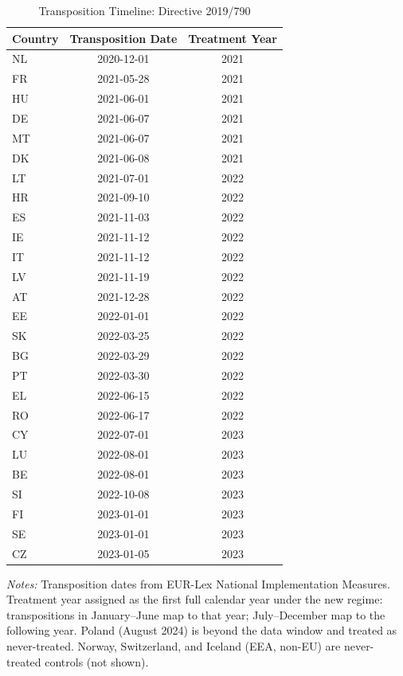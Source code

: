 \begin{table}[htbp]
\centering
\caption{Transposition Timeline: Directive 2019/790}
\label{tab:transposition}
\begin{tabular}{lcc}
\hline\hline
Country & Transposition Date & Treatment Year \\
\hline
NL & 2020-12-01 & 2021 \\
FR & 2021-05-28 & 2021 \\
HU & 2021-06-01 & 2021 \\
DE & 2021-06-07 & 2021 \\
MT & 2021-06-07 & 2021 \\
DK & 2021-06-08 & 2021 \\
LT & 2021-07-01 & 2022 \\
HR & 2021-09-10 & 2022 \\
ES & 2021-11-03 & 2022 \\
IE & 2021-11-12 & 2022 \\
IT & 2021-11-12 & 2022 \\
LV & 2021-11-19 & 2022 \\
AT & 2021-12-28 & 2022 \\
EE & 2022-01-01 & 2022 \\
SK & 2022-03-25 & 2022 \\
BG & 2022-03-29 & 2022 \\
PT & 2022-03-30 & 2022 \\
EL & 2022-06-15 & 2022 \\
RO & 2022-06-17 & 2022 \\
CY & 2022-07-01 & 2023 \\
LU & 2022-08-01 & 2023 \\
BE & 2022-08-01 & 2023 \\
SI & 2022-10-08 & 2023 \\
FI & 2023-01-01 & 2023 \\
SE & 2023-01-01 & 2023 \\
CZ & 2023-01-05 & 2023 \\
\hline\hline
\end{tabular}
\begin{tablenotes}[flushleft]\small
\item \textit{Notes:} Transposition dates from EUR-Lex National Implementation Measures. Treatment year assigned as the first full calendar year under the new regime: transpositions in January--June map to that year; July--December map to the following year. Poland (August 2024) is beyond the data window and treated as never-treated. Norway, Switzerland, and Iceland (EEA, non-EU) are never-treated controls (not shown).
\end{tablenotes}
\end{table}


